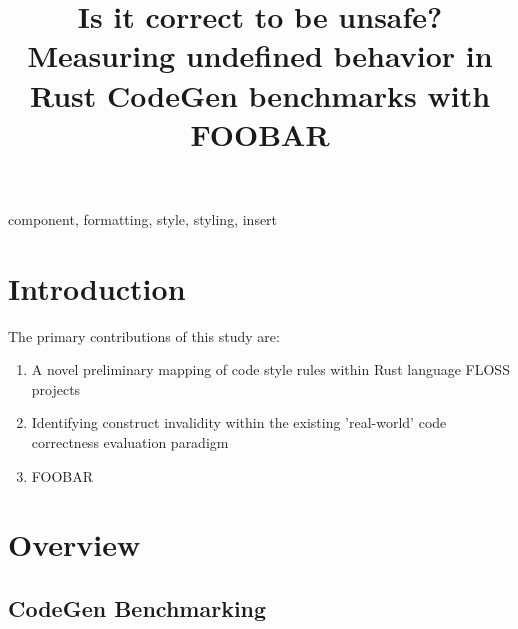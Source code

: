 \documentclass[10pt,conference, anon]{IEEEtran}
\begin{document}
\title{Is it correct to be unsafe? Measuring undefined behavior  in Rust CodeGen benchmarks with FOOBAR}

\author{}
\maketitle

\begin{abstract}

\end{abstract}

\begin{IEEEkeywords}
component, formatting, style, styling, insert
\end{IEEEkeywords}

\section{Introduction}

The primary contributions of this study are:
\begin{enumerate}
	\item A novel preliminary mapping of code style rules within Rust language FLOSS projects
	\item Identifying construct invalidity within the existing 'real-world' code correctness evaluation paradigm
	\item FOOBAR
\end{enumerate}

\section{Overview}

\subsection{CodeGen Benchmarking}
\end{document}
